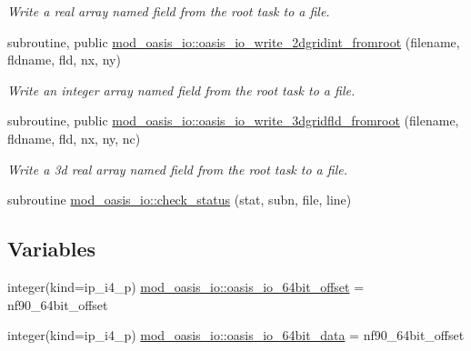 \begin{DoxyCompactItemize}
\begin{DoxyCompactList}\small\item\em Write a real array named field from the root task to a file. \end{DoxyCompactList}\item 
subroutine, public \hyperlink{namespacemod__oasis__io_a432ecb26e0e2d8387c1601ea6cc68668}{mod\+\_\+oasis\+\_\+io\+::oasis\+\_\+io\+\_\+write\+\_\+2dgridint\+\_\+fromroot} (filename, fldname, fld, nx, ny)
\begin{DoxyCompactList}\small\item\em Write an integer array named field from the root task to a file. \end{DoxyCompactList}\item 
subroutine, public \hyperlink{namespacemod__oasis__io_aa967e930e5d6199bbc6ec9a4f3c7069e}{mod\+\_\+oasis\+\_\+io\+::oasis\+\_\+io\+\_\+write\+\_\+3dgridfld\+\_\+fromroot} (filename, fldname, fld, nx, ny, nc)
\begin{DoxyCompactList}\small\item\em Write a 3d real array named field from the root task to a file. \end{DoxyCompactList}\item 
subroutine \hyperlink{namespacemod__oasis__io_ab82165daa65fd85a13d8fe5ec9e2293e}{mod\+\_\+oasis\+\_\+io\+::check\+\_\+status} (stat, subn, file, line)
\end{DoxyCompactItemize}
\subsection*{Variables}
\begin{DoxyCompactItemize}
\item 
integer(kind=ip\+\_\+i4\+\_\+p) \hyperlink{namespacemod__oasis__io_afb3f1a32c9458479f33439c5c3a94115}{mod\+\_\+oasis\+\_\+io\+::oasis\+\_\+io\+\_\+64bit\+\_\+offset} = nf90\+\_\+64bit\+\_\+offset
\item 
integer(kind=ip\+\_\+i4\+\_\+p) \hyperlink{namespacemod__oasis__io_a18f97049c0295ca8d358d996c69a805e}{mod\+\_\+oasis\+\_\+io\+::oasis\+\_\+io\+\_\+64bit\+\_\+data} = nf90\+\_\+64bit\+\_\+offset
\end{DoxyCompactItemize}
